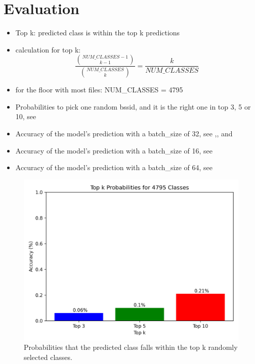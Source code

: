 \chapter{Evaluation}\label{ch:evaluation}

\begin{itemize}
    \item Top k: predicted class is within the top k predictions
    \item calculation for top k: 
    \[\frac{\binom{NUM\_CLASSES - 1}{k - 1}}{\binom{NUM\_CLASSES}{k}} = \frac{k}{NUM\_CLASSES}\]
    \item for the floor with most files: NUM\_CLASSES = 4795
    \item Probabilities to pick one random \ac{bssid}, and it is the right one in top 3, 5 or 10, see 
    \item Accuracy of the model's prediction with a batch\_size of 32, see ,, and 
    \item Accuracy of the model's prediction with a batch\_size of 16, see 
    \item Accuracy of the model's prediction with a batch\_size of 64, see 
\end{itemize}

\begin{figure}[h!]
    \centering
    \includegraphics*[scale=0.8]{images/random_accuracies_4795_classes.png}
    \caption{Probabilities that the predicted class falls within the top k randomly selected classes.}
    \label{fig:random_accuracies_4795_classes}
\end{figure}

